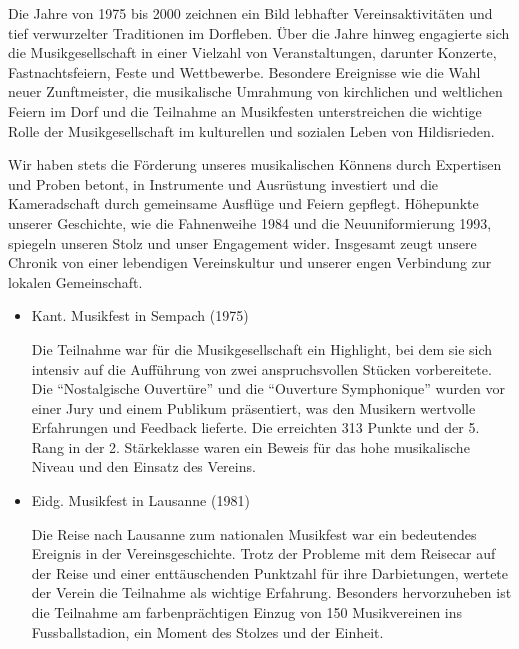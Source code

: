 \begin{history}


    Die Jahre von 1975 bis 2000 zeichnen ein Bild lebhafter Vereinsaktivitäten
    und tief verwurzelter Traditionen im Dorfleben. Über die Jahre hinweg
    engagierte sich die Musikgesellschaft in einer Vielzahl von Veranstaltungen,
    darunter Konzerte, Fastnachtsfeiern, Feste und Wettbewerbe. Besondere
    Ereignisse wie die Wahl neuer Zunftmeister, die musikalische Umrahmung von
    kirchlichen und weltlichen Feiern im Dorf und die Teilnahme an Musikfesten
    unterstreichen die wichtige Rolle der Musikgesellschaft im kulturellen und
    sozialen Leben von Hildisrieden.

    Wir haben stets die Förderung unseres musikalischen Könnens durch Expertisen
    und Proben betont, in Instrumente und Ausrüstung investiert und die
    Kameradschaft durch gemeinsame Ausflüge und Feiern gepflegt. Höhepunkte
    unserer Geschichte, wie die Fahnenweihe 1984 und die Neuuniformierung 1993,
    spiegeln unseren Stolz und unser Engagement wider. Insgesamt zeugt unsere
    Chronik von einer lebendigen Vereinskultur und unserer engen Verbindung zur
    lokalen Gemeinschaft.

    \begin{itemize}

        \item[]Kant. Musikfest in Sempach (1975)

        Die Teilnahme war für die Musikgesellschaft ein Highlight, bei dem sie
        sich intensiv auf die Aufführung von zwei anspruchsvollen Stücken
        vorbereitete. Die \enquote{Nostalgische Ouvertüre} und die
        \enquote{Ouverture Symphonique} wurden vor einer Jury und einem Publikum
        präsentiert, was den Musikern wertvolle Erfahrungen und Feedback
        lieferte. Die erreichten 313 Punkte und der 5. Rang in der 2.
        Stärkeklasse waren ein Beweis für das hohe musikalische Niveau und den
        Einsatz des Vereins.

        \item[]Eidg. Musikfest in Lausanne (1981)

        Die Reise nach Lausanne zum nationalen Musikfest war ein bedeutendes
        Ereignis in der Vereinsgeschichte. Trotz der Probleme mit dem Reisecar
        auf der Reise und einer enttäuschenden Punktzahl für ihre Darbietungen,
        wertete der Verein die Teilnahme als wichtige Erfahrung. Besonders
        hervorzuheben ist die Teilnahme am farbenprächtigen Einzug von 150
        Musikvereinen ins Fussballstadion, ein Moment des Stolzes und der
        Einheit.


\end{itemize}
\end{history}
